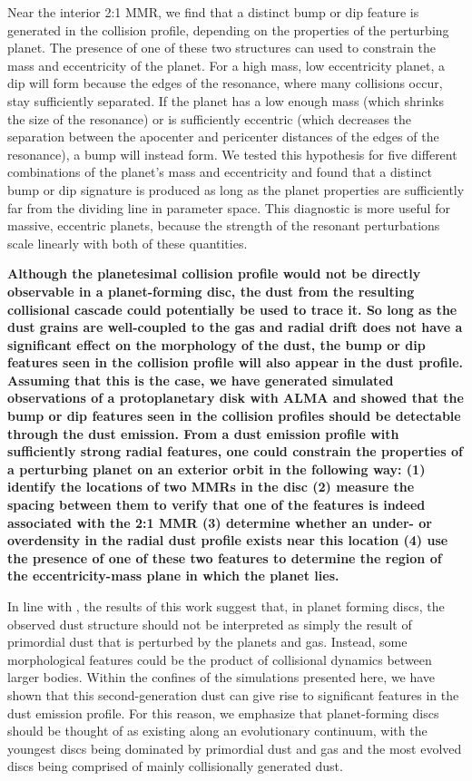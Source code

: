 \documentclass[fleqn,usenatbib]{mnras}
\begin{document}
Near the interior 2:1 MMR, we find that a distinct bump or dip feature is generated in the collision profile, depending on the properties of the perturbing 
planet. The presence of one of these two structures can used to constrain the mass and eccentricity of the planet. For a high mass, low eccentricity 
planet, a dip will form because the edges of the resonance, where many collisions occur, stay sufficiently separated. If the planet 
has a low enough mass (which shrinks the size of the resonance) or is sufficiently eccentric (which decreases the separation between the apocenter 
and pericenter distances of the edges of the resonance), a bump will instead form. We tested this hypothesis for five different combinations of the 
planet's mass and eccentricity and found that a distinct bump or dip signature is produced as long as the planet properties are sufficiently far from 
the dividing line in parameter space. This diagnostic is more useful for massive, eccentric planets, because the strength of the resonant 
perturbations scale linearly with both of these quantities.

\textbf{Although the planetesimal collision profile would not be directly observable in a planet-forming disc, the dust from the resulting collisional cascade could potentially be used to trace 
it. So long as the dust grains are well-coupled to the gas and radial drift does not have a significant effect on the morphology of the dust, the bump or dip features seen in the collision 
profile will also appear in the dust profile. Assuming that this is the case, we have generated simulated observations of a protoplanetary disk with ALMA and showed that the bump or dip 
features seen in the collision profiles should be detectable through the dust emission. From a dust emission profile with sufficiently strong radial features, one could constrain the 
properties of a perturbing planet on an exterior orbit in the following way: (1) identify the locations of two MMRs in the disc (2) measure the spacing between them to verify that one of the 
features is indeed associated with the 2:1 MMR (3) determine whether an under- or overdensity in the radial dust profile exists near this location (4) use the presence of one of these two 
features to determine the region of the eccentricity-mass plane in which the planet lies.}

In line with \citet{2017ApJ...850..103B}, the results of this work suggest that, in planet forming discs, the observed dust structure should not be 
interpreted as simply the result of primordial dust that is perturbed by the planets and gas. Instead, some morphological features could be the product 
of collisional dynamics between larger bodies. Within the confines of the simulations presented here, we have shown that this second-generation dust 
can give rise to significant features in the dust emission profile. For this reason, we emphasize that planet-forming discs should be thought of as 
existing along an evolutionary continuum, with the youngest discs being dominated by primordial dust and gas and the most evolved discs being 
comprised of mainly collisionally generated dust.
\end{document}
